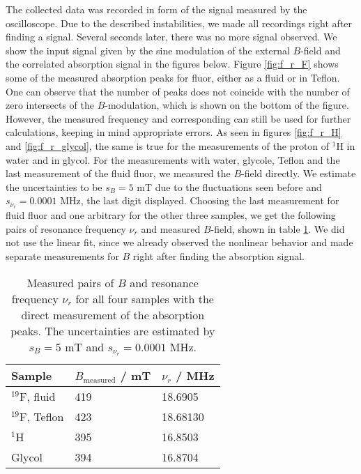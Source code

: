 The collected data was recorded in form of the signal measured by the oscilloscope. 
Due to the described instabilities, we made all recordings right after finding a signal. 
Several seconds later, there was no more signal observed.
We show the input signal given by the sine modulation of the external $B$-field and 
the correlated absorption signal in the figures below. Figure \ref{fig:f_r_F} shows 
some of the measured absorption peaks for fluor, either as a fluid or in Teflon. 
One can observe that the number of peaks does not coincide with the number of zero 
intersects of the $B$-modulation, which is shown on the bottom of the figure. 
However, the measured frequency and corresponding can still be used for further calculations, 
keeping in mind appropriate errors. 
As seen in figures \ref{fig:f_r_H} and \ref{fig:f_r_glycol}, the same is true for 
the measurements of the proton of $^1$H in water and in glycol. For the measurements with 
water, glycole, Teflon and the last measurement of the fluid fluor, we measured the $B$-field 
directly. We estimate the uncertainties to be $s_B = 5$ mT due to the fluctuations seen before and 
$s_{\nu_r} = 0.0001$ MHz, the last digit displayed. 
Choosing the last measurement for fluid fluor and one arbitrary for the other three samples, we get the 
following pairs of resonance frequency $\nu_r$ and measured 
$B$-field, shown in table \ref{tab:f_r}. 
We did not use the linear fit, since we already observed the nonlinear behavior and 
made separate measurements for $B$ right after finding the absorption signal. 
\renewcommand{\arraystretch}{1.5}
\begin{table}[htdp]
\centering
\begin{tabular}{|p{6.18cm}|p{3.82cm}|p{3.82cm}|}
        \hline
        \rowcolor{LightCyan}
        Sample & $B_\mathrm{measured}$ / mT & $\nu_r$ / MHz\\ \hline
        $^{19}$F, fluid & 419 & 18.6905\\
        $^{19}$F, Teflon & 423 & 18.68130\\
        $^1$H   & 395 & 16.8503 \\
        Glycol  & 394 & 16.8704 \\
        \hline
    \end{tabular}
    \caption{
        Measured pairs of $B$ and resonance frequency $\nu_r$ for all four samples with the direct measurement 
        of the absorption peaks. The uncertainties are estimated by $s_B = 5$ mT 
        and $s_{\nu_r} = 0.0001$ MHz. 
        }
    \label{tab:f_r}
\end{table}

\FloatBarrier

